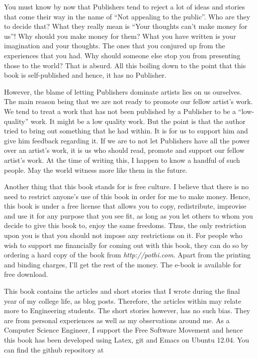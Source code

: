 \documentclass[twoside,11pt,titlepage]{article}
\begin{document}
You must know by now that Publishers tend to reject a lot of ideas and stories that come their way in the name of ``Not appealing to the public''. Who are they to decide that? What they really mean is ``Your thoughts can't make money for us''! Why should you make money for them? What you have written is your imagination and your thoughts. The ones that you conjured up from the experiences that you had. Why should someone else stop you from presenting those to the world? That is absurd. All this boiling down to the point that this book is self-published and hence, it has no Publisher.

However, the blame of letting Publishers dominate artists lies on us ourselves. The main reason being that we are not ready to promote our fellow artist's work. We tend to treat a work that has not been published by a Publisher to be a ``low-quality'' work. It might be a low quality work. But the point is that the author tried to bring out something that he had within. It is for us to support him and give him feedback regarding it. If we are to not let Publishers have all the power over an artist's work, it is us who should read, promote and support our fellow artist's work. At the time of writing this, I happen to know a handful of such people. May the world witness more like them in the future.

Another thing that this book stands for is free culture. I believe that there is no need to restrict anyone's use of this book in order for me to make money. Hence, this book is under a free license that allows you to copy, redistribute, improvise and use it for any purpose that you see fit, as long as you let others to whom you decide to give this book to, enjoy the same freedoms. Thus, the only restriction upon you is that you should not impose any restrictions on it. For people who wish to support me financially for coming out with this book, they can do so by ordering a hard copy of the book from \emph{http://pothi.com}. Apart from the printing and binding charges, I'll get the rest of the money. The e-book is available for free download.

This book contains the articles and short stories that I wrote during the final year of my college life, as blog posts. Therefore, the articles within may relate more to Engineering students. The short stories however, has no such bias. They are from personal experiences as well as my observations around me. As a Computer Science Engineer, I support the Free Software Movement and hence this book has been developed using Latex, git and Emacs on Ubuntu 12.04. You can find the github repository at
 
\end{document}
